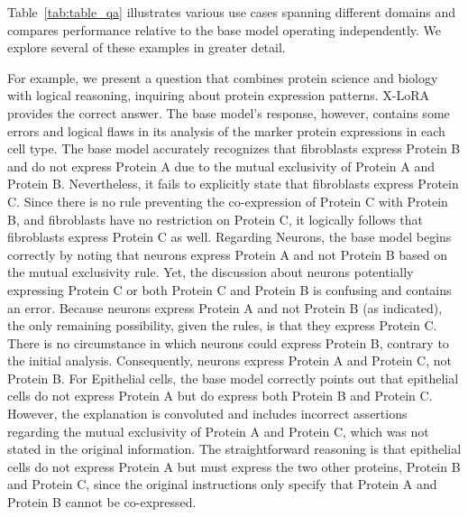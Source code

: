 Table~\ref{tab:table_qa} illustrates various use cases spanning different domains and compares performance relative to the base model operating independently. We explore several of these examples in greater detail.

For example, we present a question that combines protein science and biology with logical reasoning, inquiring about protein expression patterns. X-LoRA provides the correct answer. The base model's response, however, contains some errors and logical flaws in its analysis of the marker protein expressions in each cell type. The base model accurately recognizes that fibroblasts express Protein B and do not express Protein A due to the mutual exclusivity of Protein A and Protein B. Nevertheless, it fails to explicitly state that fibroblasts express Protein C. Since there is no rule preventing the co-expression of Protein C with Protein B, and fibroblasts have no restriction on Protein C, it logically follows that fibroblasts express Protein C as well. Regarding Neurons, the base model begins correctly by noting that neurons express Protein A and not Protein B based on the mutual exclusivity rule. Yet, the discussion about neurons potentially expressing Protein C or both Protein C and Protein B is confusing and contains an error. Because neurons express Protein A and not Protein B (as indicated), the only remaining possibility, given the rules, is that they express Protein C. There is no circumstance in which neurons could express Protein B, contrary to the initial analysis. Consequently, neurons express Protein A and Protein C, not Protein B. For Epithelial cells, the base model correctly points out that epithelial cells do not express Protein A but do express both Protein B and Protein C. However, the explanation is convoluted and includes incorrect assertions regarding the mutual exclusivity of Protein A and Protein C, which was not stated in the original information. The straightforward reasoning is that epithelial cells do not express Protein A but must express the two other proteins, Protein B and Protein C, since the original instructions only specify that Protein A and Protein B cannot be co-expressed.

